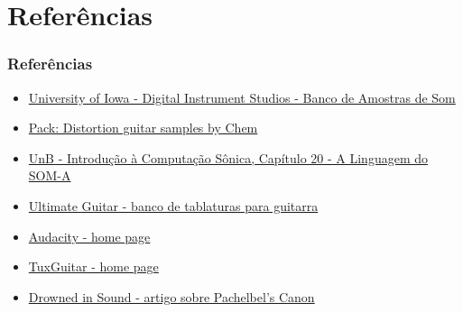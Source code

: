 \documentclass{beamer}
\begin{document}
\section{Referências}
\begin{frame}
  \frametitle{Referências}
  \begin{itemize}
  \item \href{http://theremin.music.uiowa.edu/MIS.html}{University of Iowa - Digital Instrument Studios - Banco de Amostras de Som}
  \item \href{https://www.freesound.org/people/Chem/packs/1995/}{Pack: Distortion guitar samples by Chem}
  \item \href{http://www.cic.unb.br/docentes/lcmm/deptcic2014_1/ics/a20/a20.html}{UnB - Introdução à Computação Sônica, Capítulo 20 - A Linguagem do SOM-A}
\item \href{http://www.ultimate-guitar.com/}{Ultimate Guitar - banco de tablaturas para guitarra}  
\item \href{http://audacity.sourceforge.net/?lang=pt-BR}{Audacity - home page}
\item \href{http://tuxguitar.herac.com.ar/}{TuxGuitar - home page}
\item \href{http://drownedinsound.com/in_depth/4146352-canon-in-the-1990s--from-spiritualized-to-coolio-regurgitating-pachelbels-canon}{Drowned in Sound - artigo sobre Pachelbel's Canon}
  \end{itemize}
\end{frame}
\end{document}

